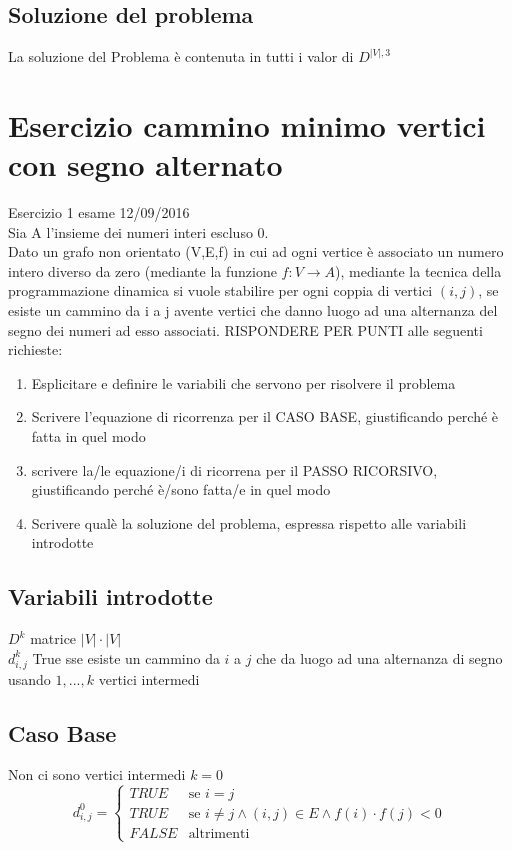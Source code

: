 \documentclass[12pt, a4paper, openany]{book}
\begin{document}
\subsection*{Soluzione del problema}
La soluzione del Problema è contenuta in tutti i valor di $D^{|V|,3}$

\section{Esercizio cammino minimo vertici con segno alternato} Esercizio 1 esame 12/09/2016\\
Sia A l'insieme dei numeri interi escluso 0.\\
Dato un grafo non orientato (V,E,f) in cui ad ogni vertice è associato un numero intero
diverso da zero (mediante la funzione $f: V\rightarrow A$), mediante la tecnica della
programmazione dinamica si vuole stabilire per ogni coppia di vertici $(i,j)$, se esiste un
cammino da i a j avente vertici che danno luogo ad una alternanza del segno dei numeri
ad esso associati. RISPONDERE PER PUNTI alle seguenti richieste:
\begin{enumerate}
    \item Esplicitare e definire le variabili che servono per risolvere il problema
    \item Scrivere l'equazione di ricorrenza per il CASO BASE, giustificando perché è fatta in quel modo
    \item scrivere la/le equazione/i di ricorrena per il PASSO RICORSIVO, giustificando perché è/sono fatta/e in quel modo
    \item Scrivere qualè la soluzione del problema, espressa rispetto alle variabili introdotte
\end{enumerate}

\subsection*{Variabili introdotte}
$D^k$ matrice $|V|\cdot|V|$
\\$d^k_{i,j}$ True sse esiste un cammino da $i$ a $j$ che da luogo ad una alternanza di segno usando ${1,...,k}$ vertici intermedi
    \subsection*{Caso Base} Non ci sono vertici intermedi $k=0$
    \begin{equation*}
        d^0_{i,j} = \begin{cases}
            TRUE  & \text{se $i=j$}                                                  \\
            TRUE  & \text{se $i\neq j \land (i,j) \in E \land f(i) \cdot f(j) < 0 $} \\
            FALSE & \text{altrimenti}
        \end{cases}
    \end{equation*}
\end{document}
